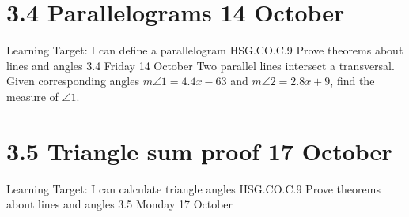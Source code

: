 \section{3.4 Parallelograms \hfill 14 October}
\begin{frame}{Learning Target: I can define a parallelogram}
  {HSG.CO.C.9 Prove theorems about lines and angles  \hfill \alert{3.4 Friday 14 October}}
  Two parallel lines intersect a transversal. Given corresponding angles  $m\angle 1 = 4.4x - 63$ and $m\angle 2 = 2.8x+9$, find the measure of $\angle 1$. 
  \begin{flushright}
    \end{flushright}
\end{frame}

\section{3.5 Triangle sum proof \hfill 17 October}
\begin{frame}{Learning Target: I can calculate triangle angles}
  {HSG.CO.C.9 Prove theorems about lines and angles  \hfill \alert{3.5 Monday 17 October}}

\end{frame}

